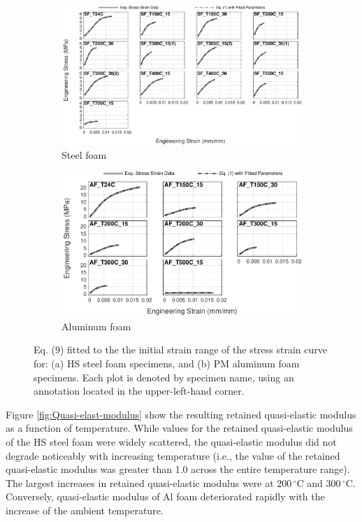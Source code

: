 \documentclass[review]{elsarticle}
\begin{document}
{\begin{figure}
	\centering
	\begin{subfigure}{1.00\textwidth}
		\centering
		\includegraphics[width=0.90\linewidth]
		{Tex-Figures/Fig16a-quasi-Elastic-fit-Fe.pdf}
		\caption{Steel foam}
		\label{fig:qElas_Rich_Steel}
	\end{subfigure}

	\par\bigskip %

	\begin{subfigure}{1.00\textwidth}
		\centering
		\includegraphics[width=0.70\linewidth]
		{Tex-Figures/Fig16b-quasi-Elastic-fit-Al.pdf}
		\caption{Aluminum foam}
		\label{fig:qElas_Rich_Al}
	\end{subfigure}
	\caption{ Eq. (9) fitted to the the initial strain range of the stress strain curve for: (a) HS steel foam specimens, and (b) PM aluminum foam specimens. Each plot is denoted by specimen name, using an annotation located in the upper-left-hand corner.}
	\label{fig:Stress_strain_elast_fit}
\end{figure}

Figure \ref{fig:Quasi-elast-modulus} show the resulting retained quasi-elastic modulus as a function of temperature. While values for the retained quasi-elastic modulus of the HS steel foam were widely scattered, the quasi-elastic modulus did not degrade noticeably with increasing temperature (i.e., the value of the retained quasi-elastic modulus was greater than 1.0 across the entire temperature range). The largest increases in retained quasi-elastic modulus were at $200\,^{\circ}\mathrm{C}$ and $300\,^{\circ}\mathrm{C}$. Conversely, quasi-elastic modulus of Al foam deteriorated rapidly with the increase of the ambient temperature.


}
\end{document}
